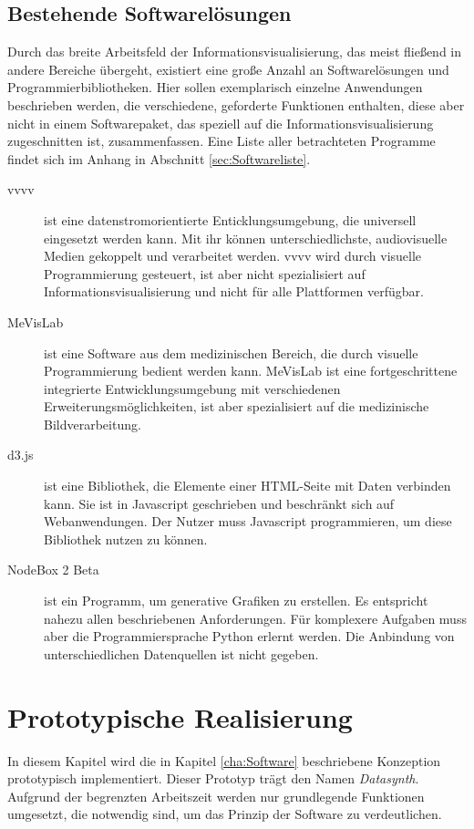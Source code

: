 \documentclass[a4paper, 
               12pt,
               DIV=calc,
               version=first,
               pdftex,
               headsepline,
               footsepline,
               bibliography=totocnumbered,
               listof=numbered]{scrreprt}
\begin{document}
\section{Bestehende Softwarelösungen}
\label{sec:bestehendeSoftware}
Durch das breite Arbeitsfeld der Informationsvisualisierung, das meist
fließend in andere Bereiche übergeht, existiert eine große Anzahl an
Softwarelösungen und Programmierbibliotheken. Hier sollen exemplarisch
einzelne Anwendungen beschrieben werden, die verschiedene, geforderte
Funktionen enthalten, diese aber nicht in einem Softwarepaket, das
speziell auf die Informationsvisualisierung zugeschnitten ist, zusammenfassen.
Eine Liste aller betrachteten Programme findet sich im Anhang in Abschnitt
\ref{sec:Softwareliste}.
\begin{description}
\item[vvvv]
ist eine datenstromorientierte Enticklungsumgebung, die universell eingesetzt werden kann.
Mit ihr können unterschiedlichste, audiovisuelle Medien gekoppelt und
verarbeitet werden. vvvv wird durch visuelle Programmierung gesteuert, ist aber
nicht spezialisiert auf Informationsvisualisierung und nicht für alle
Plattformen verfügbar.
\item[MeVisLab]
ist eine Software aus dem medizinischen Bereich, die durch visuelle
Programmierung bedient werden kann. MeVisLab ist eine fortgeschrittene
integrierte Entwicklungsumgebung mit verschiedenen
Erweiterungsmöglichkeiten, ist aber spezialisiert auf die medizinische
Bildverarbeitung.
\item[d3.js]
ist eine Bibliothek, die Elemente einer HTML-Seite mit Daten verbinden kann.
Sie ist in Javascript geschrieben und beschränkt sich auf
Webanwendungen. Der Nutzer muss Javascript programmieren, um diese
Bibliothek nutzen zu können.
\item[NodeBox 2 Beta]
ist ein Programm, um generative Grafiken zu erstellen. Es entspricht nahezu
allen beschriebenen Anforderungen. Für komplexere Aufgaben muss aber
die Programmiersprache Python erlernt werden. Die Anbindung von unterschiedlichen Datenquellen
ist nicht gegeben.
\end{description}

\chapter{Prototypische Realisierung}
\label{cha:Umsetzung}
In diesem Kapitel wird die in Kapitel \ref{cha:Software} beschriebene Konzeption prototypisch implementiert.
Dieser Prototyp trägt den Namen \textit{Datasynth}.
Aufgrund der begrenzten Arbeitszeit werden nur grundlegende Funktionen umgesetzt,
die notwendig sind, um das Prinzip der Software zu verdeutlichen.
\end{document}
